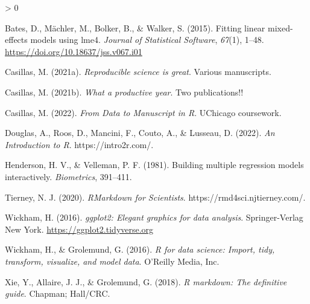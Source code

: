 \documentclass[
]{article}
\newlength{\cslhangindent}
\newenvironment{CSLReferences}[2] %
 {%
  \setlength{\parindent}{0pt}
  \ifodd #1 \everypar{\setlength{\hangindent}{\cslhangindent}}\ignorespaces\fi
  \ifnum #2 > 0
  \setlength{\parskip}{#2\baselineskip}
  \fi
 }%
 {}
\begin{document}
\hypertarget{refs}{}
\begin{CSLReferences}{1}{0}
\leavevmode\hypertarget{ref-lme4}{}%
Bates, D., Mächler, M., Bolker, B., \& Walker, S. (2015). Fitting linear mixed-effects models using {lme4}. \emph{Journal of Statistical Software}, \emph{67}(1), 1--48. \url{https://doi.org/10.18637/jss.v067.i01}

\leavevmode\hypertarget{ref-casillas2021r}{}%
Casillas, M. (2021a). \emph{{Reproducible science is great}}. Various manuscripts.

\leavevmode\hypertarget{ref-casillas2021productive}{}%
Casillas, M. (2021b). \emph{{What a productive year}}. Two publications!!

\leavevmode\hypertarget{ref-casillas2022d2mr}{}%
Casillas, M. (2022). \emph{{From Data to Manuscript in R}}. UChicago coursework.

\leavevmode\hypertarget{ref-douglas2022introduction}{}%
Douglas, A., Roos, D., Mancini, F., Couto, A., \& Lusseau, D. (2022). \emph{{An Introduction to R}}. https://intro2r.com/.

\leavevmode\hypertarget{ref-henderson1981building}{}%
Henderson, H. V., \& Velleman, P. F. (1981). Building multiple regression models interactively. \emph{Biometrics}, 391--411.

\leavevmode\hypertarget{ref-tierney2020rmarkdown}{}%
Tierney, N. J. (2020). \emph{{RMarkdown for Scientists}}. https://rmd4sci.njtierney.com/.

\leavevmode\hypertarget{ref-ggplot2}{}%
Wickham, H. (2016). \emph{ggplot2: Elegant graphics for data analysis}. Springer-Verlag New York. \url{https://ggplot2.tidyverse.org}

\leavevmode\hypertarget{ref-wickham2016r4ds}{}%
Wickham, H., \& Grolemund, G. (2016). \emph{R for data science: Import, tidy, transform, visualize, and model data}. O'Reilly Media, Inc.

\leavevmode\hypertarget{ref-xie2018bookdown}{}%
Xie, Y., Allaire, J. J., \& Grolemund, G. (2018). \emph{R markdown: The definitive guide}. Chapman; Hall/CRC.

\end{CSLReferences}
\end{document}
